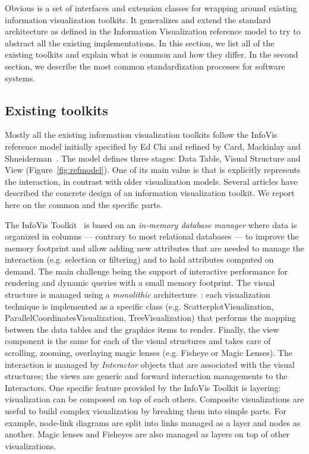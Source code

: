 Obvious is a set of interfaces and extension classes for wrapping
around existing information visualization toolkits.  It generalizes
and extend the standard architecture as defined in the Information
Visualization reference model to try to abstract all the existing
implementations.  In this section, we list all of the existing
toolkits and explain what is common and how they differ.  In the
second section, we describe the most common standardization processes
for software systems.

\subsection{Existing toolkits}

Mostly all the existing information visualization toolkits follow the
InfoVis reference model initially specified by Ed Chi and refined by
Card, Mackinlay and Shneiderman~\cite{ChiRefModel,ReadingsIV}.  The
model defines three stages: Data Table, Visual Structure and View
(Figure~\ref{fig:refmodel}).  One of its main value is that is
explicitly represents the interaction, in contrast with older
visualization models.
Several articles have described the concrete design of an information
visualization toolkit.  We report here on the common and the
specific parts.

The InfoVis Toolkit~\cite{InfoVis} is based on an \emph{in-memory
  database manager} where data is organized in columns --- contrary to
most relational databases --- to improve the memory footprint and
allow adding new attributes that are needed to manage the interaction
(e.g. selection or filtering) and to hold attributes computed on
demand.  The main challenge being the support of interactive
performance for rendering and dynamic queries with a small memory
footprint.  The visual structure is managed using a \emph{monolithic}
architecture~\cite{Polylithic}: each visualization technique is
implemented as a specific class (e.g. ScatterplotVisualization,
ParallelCoordinatesVisualization, TreeVisualization) that performs the
mapping between the data tables and the graphics items to render.
Finally, the view component is the same for each of the visual
structures and takes care of scrolling, zooming, overlaying magic
lenses (e.g. Fisheye or Magic Lenses).  The interaction is managed by
\emph{Interactor} objects that are associated with the visual
structures; the views are generic and forward interaction managements
to the Interactors.  One specific feature provided by the InfoVis
Toolkit is layering: visualization can be composed on top of each
others.  Composite visualizations are useful to build complex
visualization by breaking them into simple parts. For example,
node-link diagrams are split into links managed as a layer and nodes
as another.  Magic lenses and Fisheyes are also managed as layers on
top of other visualizations.

